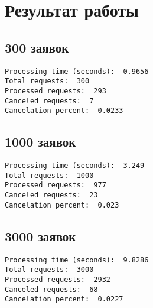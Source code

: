 \chapter{Результат работы}

\section{300 заявок}

\begin{verbatim}
Processing time (seconds):  0.9656
Total requests:  300
Processed requests:  293
Canceled requests:  7
Cancelation percent:  0.0233
\end{verbatim}


\section{1000 заявок}

\begin{verbatim}
Processing time (seconds):  3.249
Total requests:  1000
Processed requests:  977
Canceled requests:  23
Cancelation percent:  0.023
\end{verbatim}


\section{3000 заявок}

\begin{verbatim}
Processing time (seconds):  9.8286
Total requests:  3000
Processed requests:  2932
Canceled requests:  68
Cancelation percent:  0.0227
\end{verbatim}


